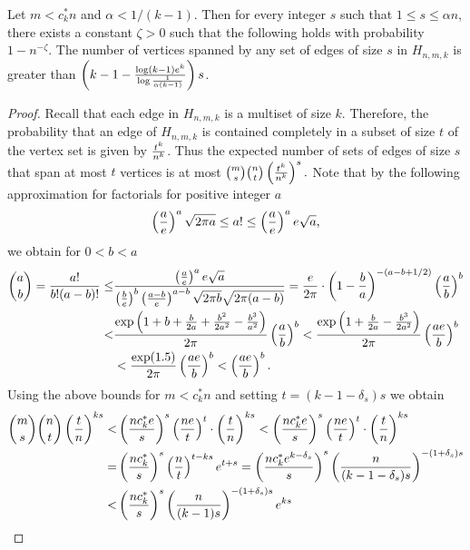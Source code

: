 \begin{lemma}\label{lem:expanhyper}
Let $m<c_k^*n$ and $\alpha < {1/(k-1)}$. Then for every integer $s$ such that $1\le s \le\alpha n$,  there exists a constant $\zeta>0$ such that the following holds with probability $1-n^{-\zeta}$.  The number of vertices spanned by any set of edges of size $s$ in $H_{n,m,k}$ is greater than $ \left( k-1- {\log(k-1)e^{k} \over \log{1\over \alpha(k-1)}}\right)s$. 
\end{lemma}
\begin{proof}
Recall that each edge in $H_{n,m,k}$ is a multiset of size $k$. Therefore, the probability that an edge of  $H_{n,m,k}$ is contained completely in a subset of size $t$ of the vertex set  is given by ${t^k\over n^k}$.
Thus the expected number of sets of edges of size $s$ that span at most $t$ vertices is at most
${m\choose s}{n\choose t} \left({t^k\over n^k}\right)^{s}.$
Note that  by the following approximation for factorials for positive integer $a$
\[\left({a\over e}\right)^a  \sqrt{2\pi a}\le a! \le \left({a\over e}\right)^a e \sqrt{a} ,
\]
we obtain for $0<b<a$
\begin{align*}
{a\choose b} = {a! \over b! (a-b)! }\le &{ \left({a\over e}\right)^a e \sqrt{a}\over \left({b\over e}\right)^b \left({a-b\over e}\right)^{a-b}\sqrt{2\pi b}\sqrt{2\pi (a-b)}} = {e\over 2\pi}\cdot \left( 1-{b\over a}\right)^{-(a-b+1/2)}\left({a\over b}\right)^b \\
<&{\exp\left(1+b+ {b\over 2a} + {b^2\over 2a^2}-{b^3\over a^2} \right) \over 2\pi}\left({a\over b}\right)^b < {\exp\left( 1+{b\over 2a} -{b^3\over 2a^2}\right) \over 2\pi}\left({ae\over b}\right)^b\\
&<{ \exp(1.5) \over 2\pi}\left({ae\over b}\right)^b < \left({ae\over b}\right)^b.
\end{align*}
Using the above bounds for $m<c^*_k n$  and setting $t= (k-1-\delta_s)s$ we obtain
\begin{align*}\label{eq:expan}
{m\choose s}{n\choose t} \left({t\over n}\right)^{ks} < & \left({nc^*_ke\over s}\right)^s  \left({ne\over t}\right)^t \cdot \left({t\over n}\right)^{ks}<  \left({nc^*_ke\over s}\right)^s  \left({ne\over t}\right)^t \cdot \left({t\over n}\right)^{ks} \\
= &\left({nc^*_k\over s}\right)^s  \left({n\over t}\right)^{t-ks} e^{t+s}
= \left({nc^*_ke^{k-\delta_s}\over s}\right)^s \left({n\over (k-1-\delta_s)s}\right)^{-(1+\delta_s)s}\\
<&  \left({nc^*_k\over s}\right)^s \left({n\over (k-1)s}\right)^{-(1+\delta_s)s} e^{ks} \\

\end{align*}
\end{proof}
